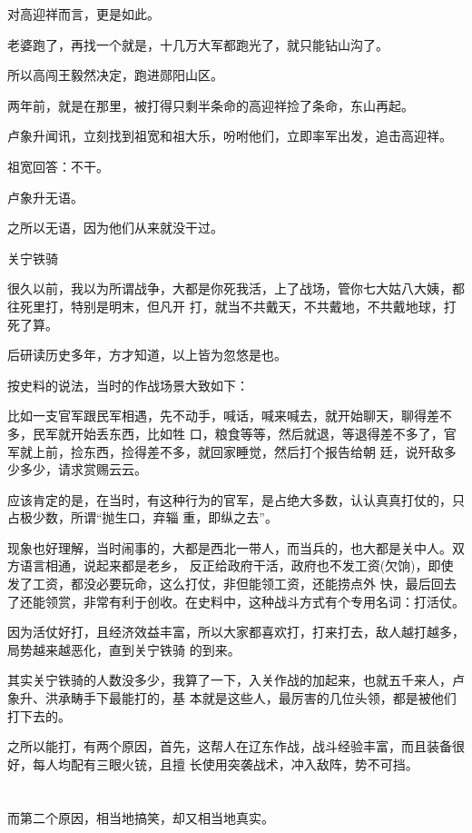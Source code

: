 \documentclass[11pt,a4paper,onecolumn]{article}
\begin{document}
对高迎祥而言，更是如此。

老婆跑了，再找一个就是，十几万大军都跑光了，就只能钻山沟了。

所以高闯王毅然决定，跑进郧阳山区。

两年前，就是在那里，被打得只剩半条命的高迎祥捡了条命，东山再起。

卢象升闻讯，立刻找到祖宽和祖大乐，吩咐他们，立即率军出发，追击高迎祥。

祖宽回答：不干。

卢象升无语。

之所以无语，因为他们从来就没干过。

关宁铁骑

很久以前，我以为所谓战争，大都是你死我活，上了战场，管你七大姑八大姨，都往死里打，特别是明末，但凡开
打，就当不共戴天，不共戴地，不共戴地球，打死了算。

后研读历史多年，方才知道，以上皆为忽悠是也。

按史料的说法，当时的作战场景大致如下：

比如一支官军跟民军相遇，先不动手，喊话，喊来喊去，就开始聊天，聊得差不多，民军就开始丢东西，比如牲
口，粮食等等，然后就退，等退得差不多了，官军就上前，捡东西，捡得差不多，就回家睡觉，然后打个报告给朝
廷，说歼敌多少多少，请求赏赐云云。

应该肯定的是，在当时，有这种行为的官军，是占绝大多数，认认真真打仗的，只占极少数，所谓``抛生口，弃辎
重，即纵之去''。

现象也好理解，当时闹事的，大都是西北一带人，而当兵的，也大都是关中人。双方语言相通，说起来都是老乡，
反正给政府干活，政府也不发工资(欠饷)，即使发了工资，都没必要玩命，这么打仗，非但能领工资，还能捞点外
快，最后回去了还能领赏，非常有利于创收。在史料中，这种战斗方式有个专用名词：打活仗。

因为活仗好打，且经济效益丰富，所以大家都喜欢打，打来打去，敌人越打越多，局势越来越恶化，直到关宁铁骑
的到来。

其实关宁铁骑的人数没多少，我算了一下，入关作战的加起来，也就五千来人，卢象升、洪承畴手下最能打的，基
本就是这些人，最厉害的几位头领，都是被他们打下去的。

之所以能打，有两个原因，首先，这帮人在辽东作战，战斗经验丰富，而且装备很好，每人均配有三眼火铳，且擅
长使用突袭战术，冲入敌阵，势不可挡。

\section[\thesection]{}

而第二个原因，相当地搞笑，却又相当地真实。
\end{document}
